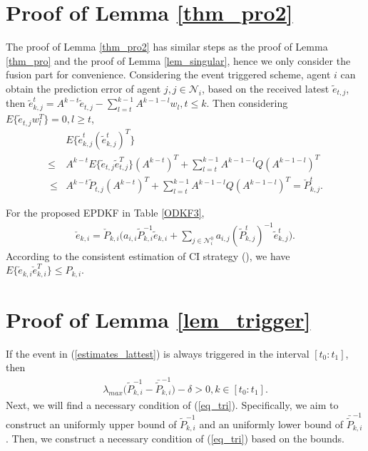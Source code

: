 \documentclass[journal,transmag]{IEEEtran}
\begin{document}
{	\section{Proof of Lemma \ref{thm_pro2}}\label{pf_thm4}
	{
The proof  of Lemma \ref{thm_pro2} has similar steps as the proof of Lemma \ref{thm_pro} and the proof of Lemma \ref{lem_singular}, hence we only consider the fusion part for convenience.
	Considering the event triggered scheme, agent $i$ can obtain the prediction error of agent $j,j\in\mathcal{N}_i$, based on the received latest $\tilde e_{t,j}$, then  $\tilde e_{k,j}^t=A^{k-t}\tilde e_{t,j}-\sum_{l=t}^{k-1}A^{k-1-l}w_{l},t\leq k.$
	Then considering $E\{\tilde e_{t,j}w_{l}^T\}=0,l\geq t$, 
	\begin{align*}
	&E\{\tilde e_{k,j}^t(\tilde e_{k,j}^t)^T\}\nonumber\\
	\leq &A^{k-t}E\{\tilde e_{t,j}\tilde e_{t,j}^T\}(A^{k-t})^T+\sum_{l=t}^{k-1}A^{k-1-l}Q(A^{k-1-l})^T\nonumber\\\
	\leq& A^{k-t}\tilde P_{t,j}(A^{k-t})^T+\sum_{l=t}^{k-1}A^{k-1-l}Q(A^{k-1-l})^T=\check P_{k,j}^t.
	\end{align*}
	
	
	
	
	For the proposed EPDKF in Table \ref{ODKF3}, 	
	\begin{equation*}
	\begin{split}
	\check e_{k,i}=\check P_{k,i}\bigg(a_{i,i}\tilde P_{k,i}^{-1}\tilde e_{k,i}+\sum_{j\in \mathcal{N}_{i}^0}a_{i,j} (\tilde P_{k,j}^t)^{-1}\tilde e_{k,j}^t\bigg).
	\end{split}
	\end{equation*}	
According to the consistent estimation of CI strategy (\cite{Julier1997A}), we have $	E\{\check e_{k,i}\check e_{k,i}^T\}\leq P_{k,i}.$
}
\section{Proof of Lemma \ref{lem_trigger}}\label{pf_lemma_tri1}
	If the event in (\ref{estimates_lattest}) is always triggered in the interval $[t_0:t_1]$, then
	\begin{align}\label{eq_tri}
	\lambda_{max}\big(\tilde P_{k,i}^{-1}-\bar{\tilde{P}}_{k,i}^{-1}\big)-\delta>0, k\in [t_0:t_1].
	\end{align}
	Next, we will find a necessary condition of (\ref{eq_tri}). Specifically, we aim to construct an uniformly upper bound of $\tilde P_{k,i}^{-1}$ and an uniformly lower bound of $\bar{\tilde{P}}_{k,i}^{-1}$. Then, we construct a necessary condition of (\ref{eq_tri}) based on the bounds.
	
}
\end{document}
